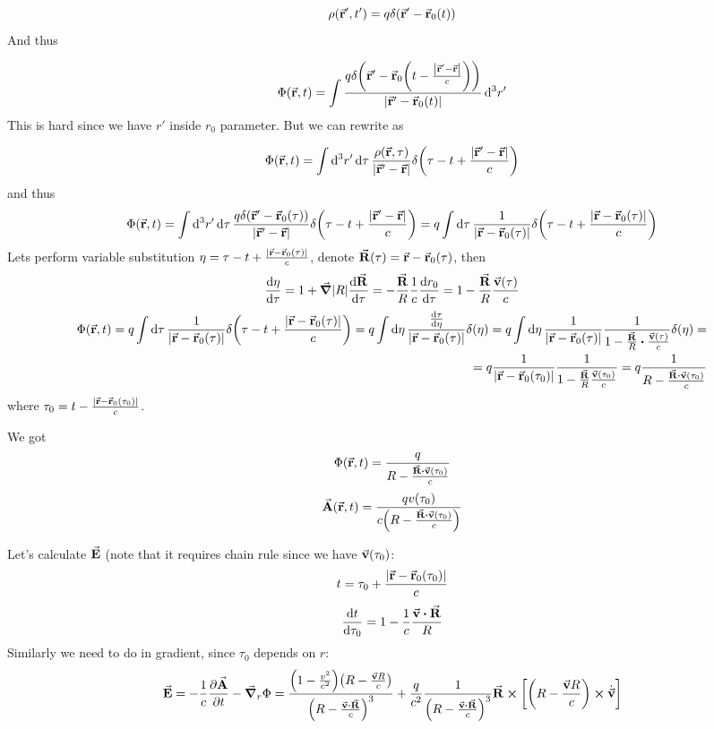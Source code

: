 $$\rho(\va{r}', t') = q\delta\qty(\va{r}'-\va{r}_0(t))$$
And thus

$$\Phi(\va{r},t) = \int \frac{q\delta\qty(\va{r}'-\va{r}_0\qty( t - \frac{ \abs{\va{r}' - \va{r}}}{c}))}{ \abs{\va{r}' - \va{r}_0(t)}} \dd[3]{r'}$$ 
This is hard since we have $r'$ inside $r_0$ parameter.
But we can rewrite as

$$\Phi(\va{r},t) = \int \dd[3]{r'} \dd{\tau}\frac{\rho\qty(\va{r}, \tau)}{ \abs{\va{r}' - \va{r}}}  \delta\qty(\tau - t + \frac{ \abs{\va{r}' - \va{r}}}{c})$$ 
and thus
$$\Phi(\va{r},t) = \int \dd[3]{r'} \dd{\tau}\frac{q\delta\qty(\va{r}'-\va{r}_0(\tau))}{ \abs{\va{r}' - \va{r}}}  \delta\qty(\tau - t + \frac{ \abs{\va{r}' - \va{r}}}{c}) = q\int  \dd{\tau}\frac{1}{ \abs{\va{r} - \va{r}_0(\tau)}}  \delta\qty(\tau - t + \frac{ \abs{\va{r} - \va{r}_0(\tau)}}{c})$$ 
Lets perform variable substitution  $\eta = \tau - t + \frac{ \abs{\va{r} - \va{r}_0(\tau)}}{c}$, denote $\va{R}(\tau) = \va{r} - \va{r}_0(\tau)$, then
$$\dv{\eta}{\tau} = 1 + \grad \abs{R} \dv{\va{R}}{\tau} = -\frac{\va{R}}{R} \frac{1}{c} \dv{r_0}{\tau} = 1- \frac{\va{R}}{R} \frac{\va{v}(\tau)}{c}$$
\begin{align*}
\Phi(\va{r},t) = q\int  \dd{\tau}\frac{1}{ \abs{\va{r} - \va{r}_0(\tau)}}  \delta\qty(\tau - t + \frac{ \abs{\va{r} - \va{r}_0(\tau)}}{c}) = q \int \dd{\eta} \frac{\dv{\tau}{\eta}}{\abs{\va{r} - \va{r}_0(\tau)}} \delta(\eta) =  q \int \dd{\eta} \frac{1}{\abs{\va{r} - \va{r}_0(\tau)}} \frac{1}{1- \frac{\va{R}}{R}\vdot \frac{\va{v}(\tau)}{c}}\delta(\eta) =\\= q \frac{1}{\abs{\va{r} - \va{r}_0(\tau_0)}} \frac{1}{1- \frac{\va{R}}{R} \frac{\va{v}(\tau_0)}{c}} = q  \frac{1}{R-  \frac{\va{R}\vdot \va{v}(\tau_0)}{c}} 
\end{align*}
where $\tau_0 =  t - \frac{ \abs{\va{r} - \va{r}_0(\tau_0)}}{c}$.

We got
$$\Phi(\va{r},t) =   \frac{q}{R-  \frac{\va{R}\vdot \va{v}(\tau_0)}{c}} $$
$$\va{A}(\va{r},t) =  \frac{q v(\tau_0)}{c\qty(R-  \frac{\va{R}\vdot \va{v}(\tau_0)}{c})} $$

Let's calculate $\va{E}$ (note that it requires chain rule since we have $\va{v}(\tau_0)$:
$$t = \tau_0 + \frac{ \abs{\va{r} - \va{r}_0(\tau_0)}}{c}$$
$$\dv{t}{\tau_0} = 1 -\frac{1}{c} \frac{\va{v}\vdot \va{R}}{R}$$
Similarly we need to do in gradient, since $\tau_0$ depends on $r$:
$$\va{E} = -\frac{1}{c} \pdv{\va{A}}{t} - \grad_r {\Phi } = \frac{\qty(1-\frac{v^2}{c^2}) \qty(R - \frac{\va{v} R }{c})}{\qty(R - \frac{\va{v} \vdot \va{R} }{c})^3} + \frac{q}{c^2} \frac{1}{\qty(R - \frac{\va{v} \vdot \va{R} }{c})^3} \va{R} \cross \qty[\qty(R - \frac{\va{v} R }{c}) \cross \dot{\va{v}}]$$  %

